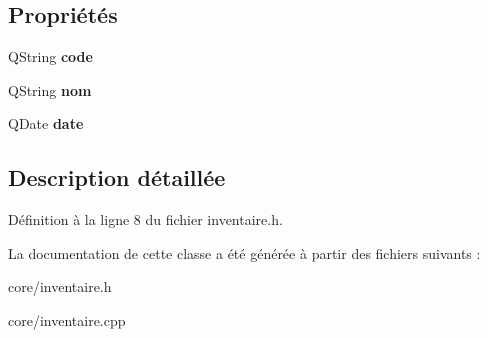\subsection*{Propriétés}
\begin{DoxyCompactItemize}
\item 
\hypertarget{class_core_1_1_inventaire_a779e2eca216bb9db2a47bfdf909d53c6}{
QString {\bfseries code}}
\label{da/d65/class_core_1_1_inventaire_a779e2eca216bb9db2a47bfdf909d53c6}

\item 
\hypertarget{class_core_1_1_inventaire_af293861f1301ffe838d0d018e3398579}{
QString {\bfseries nom}}
\label{da/d65/class_core_1_1_inventaire_af293861f1301ffe838d0d018e3398579}

\item 
\hypertarget{class_core_1_1_inventaire_afa6bc9c32828feb9979f802d7f00b3da}{
QDate {\bfseries date}}
\label{da/d65/class_core_1_1_inventaire_afa6bc9c32828feb9979f802d7f00b3da}

\end{DoxyCompactItemize}


\subsection{Description détaillée}


Définition à la ligne 8 du fichier inventaire.h.



La documentation de cette classe a été générée à partir des fichiers suivants :\begin{DoxyCompactItemize}
\item 
core/inventaire.h\item 
core/inventaire.cpp\end{DoxyCompactItemize}
